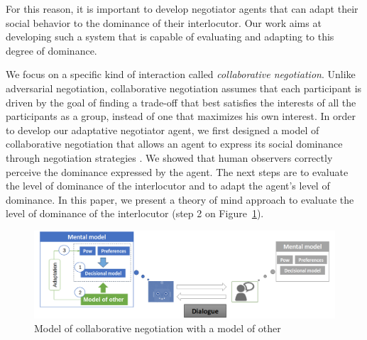 \documentclass[sigconf]{aamas}  %
\begin{document}
	For this reason, it is important to develop negotiator agents that can adapt their social behavior to the dominance of their interlocutor. Our work aims at developing such a system that is capable of evaluating and adapting to this degree of dominance.
	
	We focus on a specific kind of interaction called \emph{collaborative negotiation}. Unlike adversarial negotiation, collaborative negotiation assumes that each participant is driven by the goal of finding a trade-off that best satisfies the interests of all the participants as a group, instead of one that maximizes his own interest\cite{sidner1994artificial,chu1995response}. In order to develop our adaptative negotiator agent, we first designed a model of collaborative negotiation that allows an agent to express its social dominance through negotiation strategies \cite{ouali2017computational}. We showed that human observers correctly perceive the dominance expressed by the agent. The next steps are to evaluate the level of dominance of the interlocutor and to adapt the agent's level of dominance. In this paper, we present a theory of mind approach to evaluate the level of dominance of the interlocutor (step 2 on Figure~\ref{fig:schema-general}).

	\begin{figure}
			\includegraphics[width=\linewidth, height= 0.29\textheight]{figs/tom_reas.png}
			\caption{Model of collaborative negotiation with a model of other} 
			\label{fig:schema-general}
	\end{figure} 
	
\end{document}
